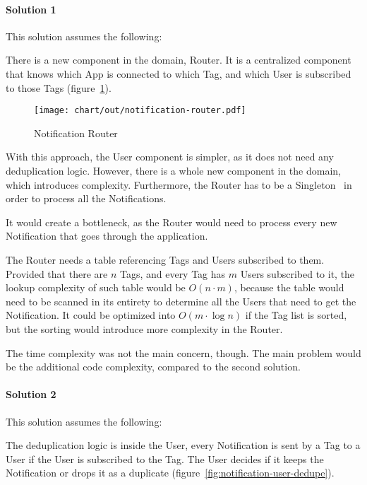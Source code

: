 \paragraph*{Solution 1}\label{par:duplication-solution-1}

This solution assumes the following:

There is a new component in the domain, Router.
It is a centralized component
that knows which App is connected to which Tag,
and which User is subscribed to those Tags
(figure~\ref{fig:notification-router}).

\begin{figure}[h]
  \centering
  \texttt{[image: chart/out/notification-router.pdf]}
  \caption{Notification Router}
  \label{fig:notification-router}
\end{figure}

With this approach,
the User component is simpler,
as it does not need any deduplication logic.
However, there is a whole new component
in the domain, which introduces complexity.
Furthermore, the Router has to be
a Singleton~\cite[pp.~127-134]{gamma_design_1994}
in order to process all the Notifications.

It would create a bottleneck,
as the Router would need to process every new Notification
that goes through the application.

The Router needs a table referencing
Tags and Users subscribed to them.
Provided that there are $n$ Tags,
and every Tag has $m$ Users subscribed to it,
the lookup complexity of such table
would be $O(n \cdot m)$,
because the table would need to be
scanned in its entirety to determine
all the Users that need to get the Notification.
It could be optimized into $O(m \cdot \log n)$
if the Tag list is sorted,
but the sorting would introduce
more complexity in the Router.

The time complexity was not the main concern, though.
The main problem would be
the additional code complexity,
compared to the second solution.

\paragraph*{Solution 2}\label{par:duplication-solution-2}

This solution assumes the following:

The deduplication logic is inside the User,
every Notification is sent by a Tag to a User
if the User is subscribed to the Tag.
The User decides if it keeps the Notification
or drops it as a duplicate
(figure~\ref{fig:notification-user-dedupe}).

